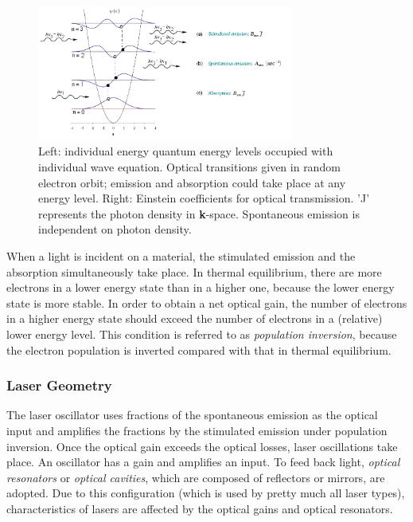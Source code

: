 \begin{figure}[ht!]
\centering
\includegraphics[width=0.75\textwidth]{chapters/img/laser.png}
\caption{Left: individual energy quantum energy levels occupied with individual wave equation. Optical transitions given in random electron orbit; emission and absorption could take place at any energy level. Right: Einstein coefficients for optical transmission. 'J' represents the photon density in \textbf{k}-space. Spontaneous emission is independent on photon density.}
\label{fig:laser}
\end{figure}
 
When a light is incident on a material, the stimulated emission and the absorption simultaneously take place. In thermal equilibrium, there are more electrons in a lower energy state than in a higher one, because the lower energy state is more stable. In order to obtain a net optical gain, the number of electrons in a higher energy state should exceed the number of electrons in a (relative) lower energy level. This condition is referred to as \textit{population inversion}, because the electron population is inverted compared with that in thermal equilibrium. 
 	
	\subsubsection{Laser Geometry}
The \acs{laser} oscillator uses fractions of the spontaneous emission as the optical input and amplifies the fractions by the stimulated emission under population inversion. Once the optical gain exceeds the optical losses, laser oscillations take place. An oscillator has a gain and amplifies an input. To feed back light, \textit{optical resonators} or \textit{optical cavities}, which are composed of reflectors or mirrors, are adopted. Due to this configuration (which is used by pretty much all \acs{laser} types), characteristics of \acs{laser}s are affected by the optical gains and optical resonators. 

